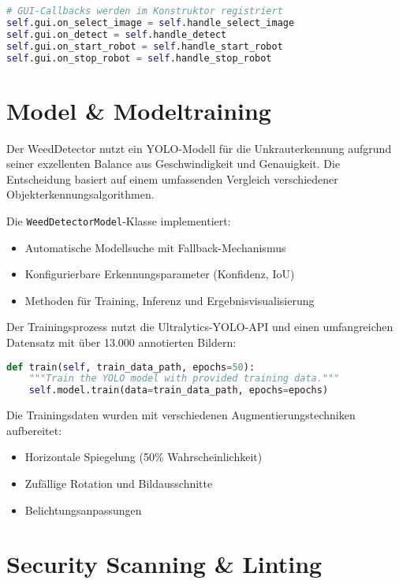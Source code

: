 \documentclass[12pt]{scrreprt}
\begin{document}
\begin{lstlisting}[language=Python, caption=Callback-Registrierung]
# GUI-Callbacks werden im Konstruktor registriert
self.gui.on_select_image = self.handle_select_image
self.gui.on_detect = self.handle_detect
self.gui.on_start_robot = self.handle_start_robot
self.gui.on_stop_robot = self.handle_stop_robot
\end{lstlisting}

\chapter{Model \& Modeltraining}

Der WeedDetector nutzt ein YOLO-Modell für die Unkrauterkennung aufgrund seiner exzellenten Balance aus Geschwindigkeit und Genauigkeit. Die Entscheidung basiert auf einem umfassenden Vergleich verschiedener Objekterkennungsalgorithmen.

Die \texttt{WeedDetectorModel}-Klasse implementiert:
\begin{itemize}
    \item Automatische Modellsuche mit Fallback-Mechanismus
    \item Konfigurierbare Erkennungsparameter (Konfidenz, IoU)
    \item Methoden für Training, Inferenz und Ergebnisvisualisierung
\end{itemize}

Der Trainingsprozess nutzt die Ultralytics-YOLO-API und einen umfangreichen Datensatz mit über 13.000 annotierten Bildern:

\begin{lstlisting}[language=Python, caption=Training]
def train(self, train_data_path, epochs=50):
    """Train the YOLO model with provided training data."""
    self.model.train(data=train_data_path, epochs=epochs)
\end{lstlisting}

Die Trainingsdaten wurden mit verschiedenen Augmentierungstechniken aufbereitet:
\begin{itemize}
    \item Horizontale Spiegelung (50\% Wahrscheinlichkeit)
    \item Zufällige Rotation und Bildausschnitte
    \item Belichtungsanpassungen
\end{itemize}

\chapter{Security Scanning \& Linting}
\end{document}
